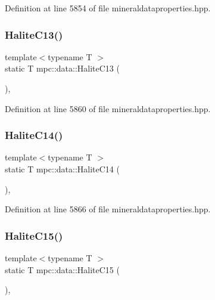 Definition at line 5854 of file mineraldataproperties.\+hpp.

\mbox{\label{namespacempc_1_1data_ae6173ed202200212d3aa15485299837b}} 
\subsubsection{\texorpdfstring{Halite\+C13()}{HaliteC13()}}
{\footnotesize\ttfamily template$<$typename T $>$ \\
static T mpc\+::data\+::\+Halite\+C13 (\begin{DoxyParamCaption}{ }\end{DoxyParamCaption})\hspace{0.3cm}{\ttfamily [inline]}, {\ttfamily [static]}}



Definition at line 5860 of file mineraldataproperties.\+hpp.

\mbox{\label{namespacempc_1_1data_a07fd11aa126ea89998cb2b8986283a51}} 
\subsubsection{\texorpdfstring{Halite\+C14()}{HaliteC14()}}
{\footnotesize\ttfamily template$<$typename T $>$ \\
static T mpc\+::data\+::\+Halite\+C14 (\begin{DoxyParamCaption}{ }\end{DoxyParamCaption})\hspace{0.3cm}{\ttfamily [inline]}, {\ttfamily [static]}}



Definition at line 5866 of file mineraldataproperties.\+hpp.

\mbox{\label{namespacempc_1_1data_a1ed7d73dd9340e67797f3811eebb01f0}} 
\subsubsection{\texorpdfstring{Halite\+C15()}{HaliteC15()}}
{\footnotesize\ttfamily template$<$typename T $>$ \\
static T mpc\+::data\+::\+Halite\+C15 (\begin{DoxyParamCaption}{ }\end{DoxyParamCaption})\hspace{0.3cm}{\ttfamily [inline]}, {\ttfamily [static]}}



